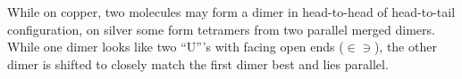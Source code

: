 	
	While on copper, two molecules may form a dimer in head-to-head of head-to-tail configuration, on silver some form tetramers from two parallel merged dimers. While one dimer looks like two ``U'''s with facing open ends ($\in \ni$), the other dimer is shifted to closely match the first dimer best and lies parallel.
	
	
